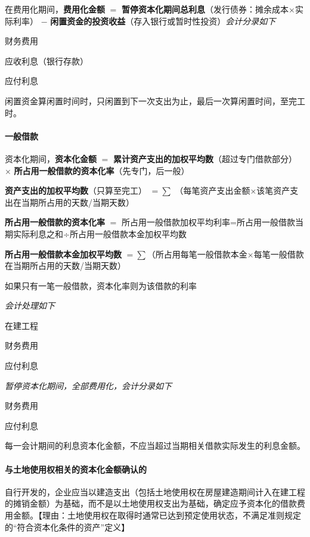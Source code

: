 \documentclass[UTF8,12pt]{ctexart}
\newenvironment{Dr}{%
	\begin{list}{}%
		{
			\setlength{\leftmargin}{2em}
			\setlength{\labelwidth}{2em}
			\setlength{\labelsep}{0pt}
			\setlength{\itemindent}{0pt}
			\setlength{\listparindent}{0pt}
			\setlength{\parsep}{0pt}
			\setlength{\topsep}{0pt}
		}
		\item[\textbf{借：}]
	}{%
	\end{list}
}
\newenvironment{Cr}{%
	\begin{list}{}%
		{
			\setlength{\leftmargin}{2em}
			\setlength{\labelwidth}{2em}
			\setlength{\labelsep}{0pt}
			\setlength{\itemindent}{0pt}
			\setlength{\listparindent}{0pt}
			\setlength{\parsep}{0pt}
			\setlength{\topsep}{0pt}
		}
		\item[\textbf{贷：}]
	}{%
	\end{list}
}
\numberwithin{equation}{section} %
\numberwithin{figure}{section}
\numberwithin{table}{section}
\begin{document}
	在费用化期间，\textbf{费用化金额} $=$ \textbf{暂停资本化期间总利息}（发行债券：摊余成本×实际利率） $-$ \textbf{闲置资金的投资收益}（存入银行或暂时性投资）\textit{会计分录如下}
	
	\begin{Dr}
		财务费用
		
		应收利息（银行存款）
	\end{Dr}
	\begin{Cr}
		应付利息
	\end{Cr}
	
	闲置资金算闲置时间时，只闲置到下一次支出为止，最后一次算闲置时间，至完工时。
	
	\paragraph{一般借款}
	资本化期间，\textbf{资本化金额} $=$ \textbf{累计资产支出的加权平均数}（超过专门借款部分） $\times$ \textbf{所占用一般借款的资本化率}（先专门，后一般）
	
	\textbf{资产支出的加权平均数}（只算至完工） $=\sum$ （每笔资产支出金额×该笔资产支出在当期所占用的天数/当期天数）
	
	\textbf{所占用一般借款的资本化率} $=$ 所占用一般借款加权平均利率=所占用一般借款当期实际利息之和÷所占用一般借款本金加权平均数
	
	\textbf{所占用一般借款本金加权平均数} $=\sum$（所占用每笔一般借款本金×每笔一般借款在当期所占用的天数/当期天数）
	
	如果只有一笔一般借款，资本化率则为该借款的利率
	
	\textit{会计处理如下}
	
	\begin{Dr}
		在建工程
		
		财务费用
	\end{Dr}
	\begin{Cr}
		应付利息
	\end{Cr}

	\textit{暂停资本化期间，全部费用化，会计分录如下}
	
	\begin{Dr}
		财务费用
	\end{Dr}
	\begin{Cr}
		应付利息
	\end{Cr}

	每一会计期间的利息资本化金额，不应当超过当期相关借款实际发生的利息金额。
	
	\paragraph{与土地使用权相关的资本化金额确认的}
	自行开发的，企业应当以建造支出（包括土地使用权在房屋建造期间计入在建工程的摊销金额）为基础，而不是以土地使用权支出为基础，确定应予资本化的借款费用金额。【理由：土地使用权在取得时通常已达到预定使用状态，不满足准则规定的“符合资本化条件的资产”定义】
	
\end{document}
